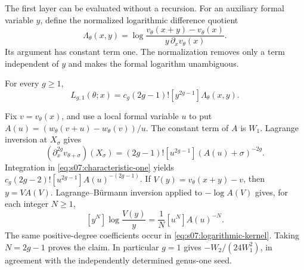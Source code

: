 The first layer can be evaluated without a recursion. For an
auxiliary formal variable $y$, define the normalized logarithmic
difference quotient
\begin{equation}\label{eq:s07:logarithmic-kernel}
 \Lambda_\theta(x,y)
 =\log\frac{v_\theta(x+y)-v_\theta(x)}
                  {y\,\partial_xv_\theta(x)}.
\end{equation}
Its argument has constant term one. The normalization removes only
a term independent of $y$ and makes the formal logarithm unambiguous.

\begin{lmm}\label{lmm:s07:first-kernel}
For every $g\geq1$,
\begin{equation}\label{eq:s07:first-kernel}
 L_{g,1}(\theta;x)
 =c_g(2g-1)![y^{2g-1}]\Lambda_\theta(x,y).
\end{equation}
\end{lmm}
\begin{prf}
Fix $v=v_\theta(x)$, and use a local formal variable $u$ to put
$A(u)=(w_\theta(v+u)-w_\theta(v))/u$.
The constant term of $A$ is $W_1$. Lagrange inversion at
$X_\sigma$ gives
\[
 (\partial_x^{2g}v_{\theta+\sigma})(X_\sigma)
 =(2g-1)![u^{2g-1}](A(u)+\sigma)^{-2g}.
\]
Integration in \eqref{eq:s07:characteristic-one} yields
$c_g(2g-2)![u^{2g-1}]A(u)^{-(2g-1)}$.
If $V(y)=v_\theta(x+y)-v$, then $y=V A(V)$.
Lagrange--B\"urmann inversion applied to $-\log A(V)$ gives,
for each integer $N\geq1$,
\[
 [y^N]\log\frac{V(y)}y
                 =\frac1N[u^N]A(u)^{-N}.
\]
The same positive-degree coefficients occur in
\eqref{eq:s07:logarithmic-kernel}. Taking $N=2g-1$ proves the
claim. In particular $g=1$ gives $-W_2/(24W_1^2)$, in agreement
with the independently determined genus-one seed.
\end{prf}
